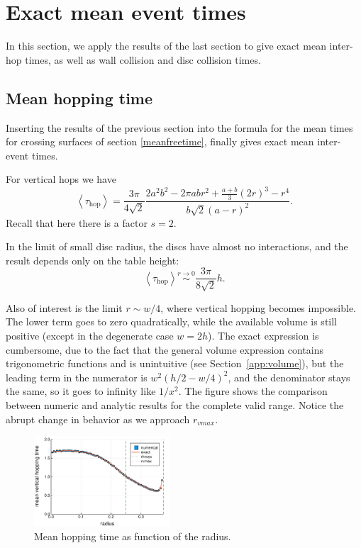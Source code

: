 \documentclass[superscriptaddress,pre,reprint,showpacs,twocolumn]{revtex4-1}
\newcommand{\mean}[1]{\left \langle #1 \right \rangle}
\begin{document}
\section{Exact mean event times}

In this section, we apply the results of the last section to give
exact mean inter-hop times, as well as wall collision and disc collision times.


\subsection{Mean hopping time}

 
Inserting the results of the previous section 
into the formula for the mean times for crossing
surfaces of section \eqref{meanfreetime}, finally gives exact mean inter-event times.

For vertical
hops we have
\begin{equation}\label{hoptau}
 \mean{\tau_\text{hop}} = 	
\frac{3 \pi}{4\sqrt{2}}
\frac{2 a^{2} b^{2}  - 2 \pi a b r^{2} + \textstyle \frac{a+b}{3}  (2r)^{3}  -  r^4}
{ b \sqrt{2}  ( a - r )^2}.
\end{equation}
Recall that here there is a factor $s = 2$.

In the limit of small disc radius, the discs have almost no interactions, and the result depends only
on the table height:
\begin{equation}\label{hoptaulimit}
 \mean{\tau_\text{hop}} \overset{r \to 0}{\sim}
\frac{3 \pi}{8\sqrt{2}}h.
\end{equation}

Also of interest is the limit $r\sim w/4$, where vertical hopping becomes
impossible.  The lower term goes to zero quadratically, while the available volume
is still positive (except in the degenerate case $w=2h$). The exact expression
is cumbersome, due to the fact that the general volume expression contains trigonometric functions
 and is unintuitive (see Section~\ref{app:volume}),
but the leading term in the numerator is  $w^2(h/2-w/4)^2$, and the denominator
stays the same, so
it goes to infinity
like $1/x^2$. The figure \label{MeanHopp01} shows the comparison between
numeric and analytic results for the complete valid range. Notice the abrupt
change in behavior as we approach $r_{vmax}$.


\begin{figure}[h]
  \centering
  \includegraphics[width=0.45\textwidth]{./figures/VertHop01.pdf}
  \caption{Mean hopping time as function of the radius.}\label{MeanHopp01}
\end{figure}
\end{document}
